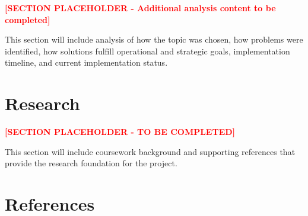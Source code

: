 \documentclass[11pt]{article}
\begin{document}
\textcolor{red}{\textbf{[SECTION PLACEHOLDER - Additional analysis content to be completed]}}

This section will include analysis of how the topic was chosen, how problems were identified, how solutions fulfill operational and strategic goals, implementation timeline, and current implementation status.

\section{Research}

\textcolor{red}{\textbf{[SECTION PLACEHOLDER - TO BE COMPLETED]}}

This section will include coursework background and supporting references that provide the research foundation for the project.

\section{References}
\end{document}
